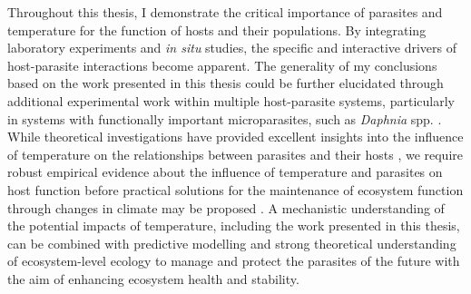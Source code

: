 Throughout this thesis, I demonstrate the critical importance of parasites and temperature for the function of hosts and their populations. By integrating laboratory experiments and \textit{in situ} studies, the specific and interactive drivers of host-parasite interactions become apparent. The generality of my conclusions based on the work presented in this thesis could be further elucidated through additional experimental work within multiple host-parasite systems, particularly in systems with functionally important microparasites, such as \textit{Daphnia} spp. \citep{johnson2006, kirk2018}. While theoretical investigations have provided excellent insights into the influence of temperature on the relationships between parasites and their hosts \citep{barber2016, cohen2017, gehman2018}, we require robust empirical evidence about the influence of temperature and parasites on host function before practical solutions for the maintenance of ecosystem function through changes in climate may be proposed \citep{rohr2011, altizer2013}. A mechanistic understanding of the potential impacts of temperature, including the work presented in this thesis, can be combined with predictive modelling and strong theoretical understanding of ecosystem-level ecology to manage and protect the parasites of the future with the aim of enhancing ecosystem health and stability. 


%